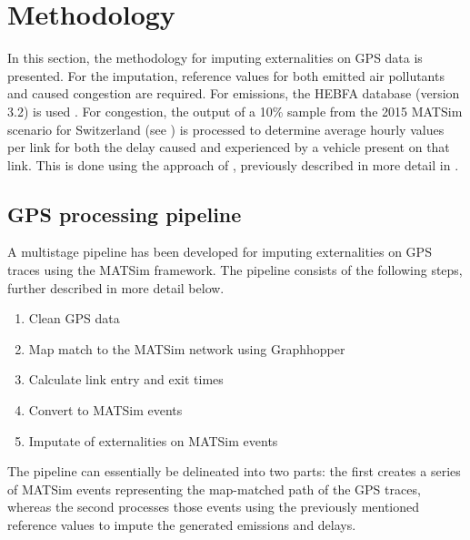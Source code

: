 \section{Methodology}

In this section, the methodology for imputing externalities on GPS data is presented.
For the imputation, reference values for both emitted air pollutants and caused congestion are required.
For emissions, the HEBFA database (version 3.2) is used \citep{hbefaVersion3.2}.
For congestion, the output of a 10\% sample from the 2015 MATSim scenario for Switzerland (see ) is processed to determine average hourly values per link for both the delay caused and experienced by a vehicle present on that link.
This is done using the approach of \citet{kaddoura2015marginal}, previously described in more detail in .

\subsection{GPS processing pipeline}

A multistage pipeline has been developed for imputing externalities on GPS traces using the MATSim framework.
The pipeline consists of the following steps, further described in more detail below.

\begin{enumerate}
 	\item Clean GPS data
 	\item Map match to the MATSim network using Graphhopper
 	\item Calculate link entry and exit times
 	\item Convert to MATSim events
	\item Imputate of externalities on MATSim events
\end{enumerate}

The pipeline can essentially be delineated into two parts: the first creates a series of MATSim events representing the map-matched path of the GPS traces, whereas the second processes those events using the previously mentioned reference values to impute the generated emissions and delays.

